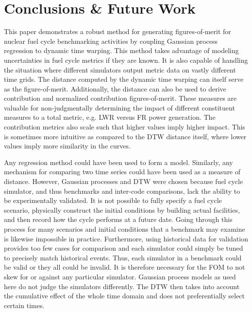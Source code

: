 \section{Conclusions \& Future Work}
\label{conclusion}

This paper demonstrates a robust method for generating figures-of-merit
for nuclear fuel cycle benchmarking activities by coupling Gaussian process
regression to dynamic time warping. This method takes advantage of modeling
uncertainties in fuel cycle metrics if they are known. It is also capable 
of handling the situation where different simulators output metric data on
vastly different time grids. The distance computed by the dynamic time 
warping can itself serve as the figure-of-merit. Additionally, the 
distance can also be used to derive contribution and normalized contribution
figures-of-merit. These measures are valuable for non-judgmentally 
determining the impact of different constituent measures to a total 
metric, e.g. LWR versus FR power generation. The contribution metrics also 
scale such that higher values imply higher impact. This is sometimes
more intuitive as compared to the DTW distance itself, where lower values 
imply more similarity in the curves.

Any regression method could have been used to form a model. Similarly, any
mechanism for comparing two time series could have been used as a measure
of distance.  However, Gaussian processes and DTW were chosen because
fuel cycle simulator, and thus benchmarks and inter-code comparisons, lack 
the ability to be experimentally validated.
It is not possible to fully specify a fuel cycle scenario,
physically construct the initial conditions by building actual facilities, 
and then record how the cycle performs at a future date. 
Going through this process for many scenarios and initial conditions that 
a benchmark may examine is likewise impossible in practice.
Furthermore, using 
historical data for validation provides too few cases for comparison and 
each simulator could simply be tuned to precisely match historical events.
Thus, each simulator in a benchmark could be valid or they all could be 
invalid. It is therefore necessary for the FOM to not skew for or against 
any particular simulator. Gaussian process models as used here do not 
judge the simulators differently. The DTW then takes into account the 
cumulative effect of the whole time domain and does not preferentially 
select certain times.

